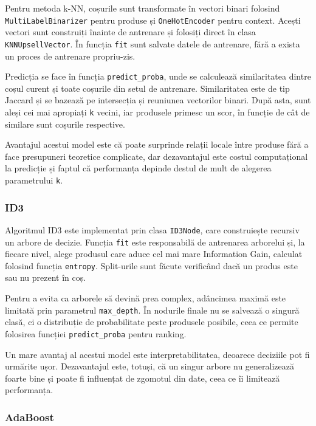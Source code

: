 \documentclass[12pt,a4paper]{article}
\begin{document}
Pentru metoda k-NN, coșurile sunt transformate în vectori binari folosind \texttt{MultiLabelBinarizer} pentru produse și \texttt{OneHotEncoder} pentru context. Acești vectori sunt construiți înainte de antrenare și folosiți direct în clasa \texttt{KNNUpsellVector}. În funcția \texttt{fit} sunt salvate datele de antrenare, fără a exista un proces de antrenare propriu-zis.

Predicția se face în funcția \texttt{predict\_proba}, unde se calculează similaritatea dintre coșul curent și toate coșurile din setul de antrenare. Similaritatea este de tip Jaccard și se bazează pe intersecția și reuniunea vectorilor binari. După asta, sunt aleși cei mai apropiați \texttt{k} vecini, iar produsele primesc un scor, în funcție de cât de similare sunt coșurile respective.

Avantajul acestui model este că poate surprinde relații locale între produse fără a face presupuneri teoretice complicate, dar dezavantajul este costul computațional la predicție și faptul că performanța depinde destul de mult de alegerea parametrului \texttt{k}.


\subsubsection{ID3}

Algoritmul ID3 este implementat prin clasa \texttt{ID3Node}, care construiește recursiv un arbore de decizie. Funcția \texttt{fit} este responsabilă de antrenarea arborelui și, la fiecare nivel, alege produsul care aduce cel mai mare Information Gain, calculat folosind funcția \texttt{entropy}. Split-urile sunt făcute verificând dacă un produs este sau nu prezent în coș.

Pentru a evita ca arborele să devină prea complex, adâncimea maximă este limitată prin parametrul \texttt{max\_depth}. În nodurile finale nu se salvează o singură clasă, ci o distribuție de probabilitate peste produsele posibile, ceea ce permite folosirea funcției \texttt{predict\_proba} pentru ranking.

Un mare avantaj al acestui model este interpretabilitatea, deoarece deciziile pot fi urmărite ușor. Dezavantajul este, totuși, că un singur arbore nu generalizează foarte bine și poate fi influențat de zgomotul din date, ceea ce îi limitează performanța.


\subsubsection{AdaBoost}
\end{document}
